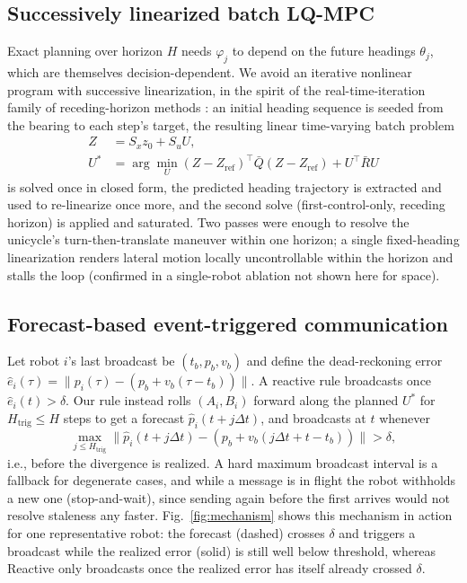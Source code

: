 \documentclass[10pt,conference]{IEEEtran}
\begin{document}
\subsection{Successively linearized batch LQ-MPC}
Exact planning over horizon $H$ needs $\varphi_j$ to depend on the future headings $\theta_j$, which are themselves decision-dependent. We avoid an iterative nonlinear program with successive linearization, in the spirit of the real-time-iteration family of receding-horizon methods \cite{rawlings2017}: an initial heading sequence is seeded from the bearing to each step's target, the resulting linear time-varying batch problem
\begin{equation}
\begin{aligned}
Z &= S_x z_0+S_u U,\\
U^* &= \arg\min_U (Z-Z_{\mathrm{ref}})^\top \bar{Q}(Z-Z_{\mathrm{ref}})+U^\top \bar{R}U
\end{aligned}
\label{eq:mpc}
\end{equation}
is solved once in closed form, the predicted heading trajectory is extracted and used to re-linearize once more, and the second solve (first-control-only, receding horizon) is applied and saturated. Two passes were enough to resolve the unicycle's turn-then-translate maneuver within one horizon; a single fixed-heading linearization renders lateral motion locally uncontrollable within the horizon and stalls the loop (confirmed in a single-robot ablation not shown here for space).

\subsection{Forecast-based event-triggered communication}
\label{sec:trigger}
Let robot $i$'s last broadcast be $(t_b,p_b,v_b)$ and define the dead-reckoning error $\hat e_i(\tau)=\|p_i(\tau)-(p_b+v_b(\tau-t_b))\|$. A reactive rule broadcasts once $\hat e_i(t)>\delta$. Our rule instead rolls $(A_i,B_i)$ forward along the planned $U^*$ for $H_{\mathrm{trig}}\le H$ steps to get a forecast $\hat p_i(t+j\Delta t)$, and broadcasts at $t$ whenever
\begin{equation}
\max_{j\le H_{\mathrm{trig}}} \big\| \hat p_i(t{+}j\Delta t) - (p_b{+}v_b(j\Delta t{+}t{-}t_b)) \big\| > \delta, \label{eq:trigger}
\end{equation}
i.e., before the divergence is realized. A hard maximum broadcast interval is a fallback for degenerate cases, and while a message is in flight the robot withholds a new one (stop-and-wait), since sending again before the first arrives would not resolve staleness any faster. Fig.~\ref{fig:mechanism} shows this mechanism in action for one representative robot: the forecast (dashed) crosses $\delta$ and triggers a broadcast while the realized error (solid) is still well below threshold, whereas Reactive only broadcasts once the realized error has itself already crossed $\delta$.
\end{document}
